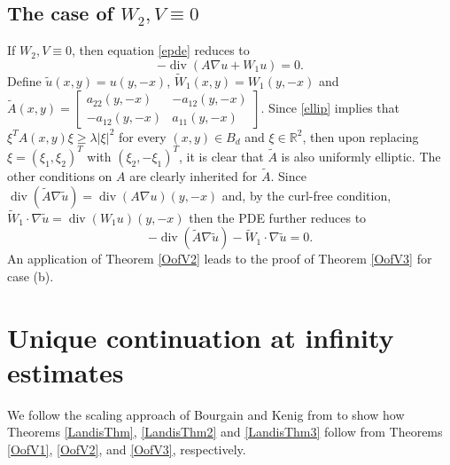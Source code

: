 \documentclass[12pt,reqno]{amsart}
\theoremstyle{plain}
\theoremstyle{definition}
\DeclareMathOperator{\di}{div}
\newcommand{\la}{\lambda}
\newcommand{\gr}{\nabla}
\newcommand{\abs}[1]{\left\vert#1\right\vert}
\newcommand{\brac}[1]{\left[#1\right]}
\newcommand{\pr}[1]{\left( #1 \right) }
\newcommand{\R}{\ensuremath{\mathbb{R}}}
\begin{document}
\subsection{The case of $W_2, V \equiv 0$}
\label{curlCor}

If $W_2, V \equiv 0$, then equation \eqref{epde} reduces to
$$-\di\pr{A \gr u + W_1 u} = 0.$$
Define $\tilde u\pr{x, y} = u\pr{y, -x}$, $\widetilde W_1\pr{x, y} = W_1\pr{y, -x}$ and $\tilde A\pr{x,y} = \brac{\begin{array}{ll} a_{22}\pr{y, -x} & -a_{12}\pr{y, -x} \\ - a_{12}\pr{y, -x} & a_{11}\pr{y, -x} \end{array}}$.
Since \eqref{ellip} implies that $\xi^T A\pr{x, y} \xi \ge \la \abs{\xi}^2$ for every $\pr{x,y} \in B_d$ and $\xi \in \R^2$, then upon replacing $\xi = \pr{\xi_1, \xi_2}^T$ with $\pr{\xi_2, -\xi_1}^T$, it is clear that $\tilde A$ is also uniformly elliptic.
The other conditions on $A$ are clearly inherited for $\tilde A$.
Since $\di\pr{\tilde A \gr \tilde u} = \di\pr{A \gr u}\pr{y, -x}$ and, by the curl-free condition, $\widetilde W_1 \cdot \gr \tilde u = \di\pr{W_1 u}\pr{y,-x}$ then the PDE further reduces to
$$-\di\pr{\tilde A \gr \tilde u} - \widetilde W_1 \cdot \gr \tilde u = 0.$$
An application of Theorem \ref{OofV2} leads to the proof of Theorem \ref{OofV3} for case (b).

\section{Unique continuation at infinity estimates}
\label{S9}

We follow the scaling approach of Bourgain and Kenig from \cite{BK05} to show how Theorems \ref{LandisThm}, \ref{LandisThm2} and \ref{LandisThm3} follow from Theorems \ref{OofV1}, \ref{OofV2}, and \ref{OofV3}, respectively.
\end{document}
